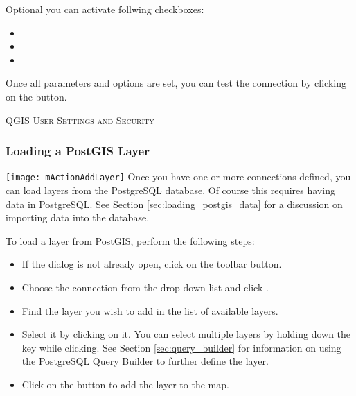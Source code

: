Optional you can activate follwing checkboxes:

\begin{itemize}
\item {}
\item {}
\item {}
\end{itemize}

Once all parameters and options are set, you can test the connection by
clicking on the  button.

\begin{Tip}\caption{\textsc{QGIS User Settings and
Security}}
\end{Tip}

\subsubsection{Loading a PostGIS Layer}

\texttt{[image: mActionAddLayer]} Once you have one or more
connections defined, you can load layers from the PostgreSQL database. Of
course this requires having data in PostgreSQL. See Section
\ref{sec:loading_postgis_data} for a discussion on importing data into the
database. 

To load a layer from PostGIS, perform the following steps:

\begin{itemize}
\item If the  dialog is not already open, click on the
 toolbar button.
\item Choose the connection from the drop-down list and click .
\item Find the layer you wish to add in the list of available layers.
\item Select it by clicking on it. You can select multiple layers by holding
down the  key while clicking. See Section \ref{sec:query_builder} for
information on using the PostgreSQL Query Builder to further define the layer.
\item Click on the  button to add the layer to the map.
\end{itemize}

